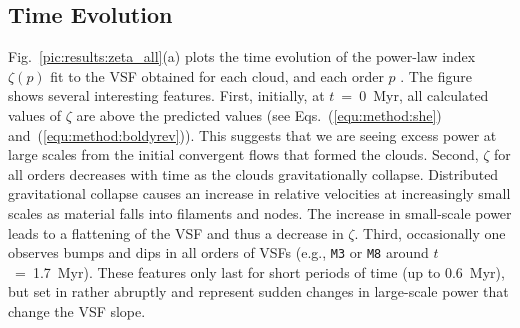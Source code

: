 \subsection{Time Evolution}

Fig.~\ref{pic:results:zeta_all}(a) plots the time evolution of the power-law index $\zeta(p)$ fit to the VSF obtained for each cloud, and each order $p$                    .
The figure shows several interesting features.
First, initially, at $t$~=~0~Myr, all calculated values of $\zeta$ are above the predicted values (see Eqs.~(\ref{equ:method:she}) and~(\ref{equ:method:boldyrev})).
     This suggests that we are seeing excess power at large scales from the initial   
     convergent flows that formed the clouds.
Second, $\zeta$ for all orders decreases with time as the clouds gravitationally collapse.
     Distributed gravitational collapse causes an increase in relative velocities at increasingly 
     small scales as material falls into filaments and nodes.  The increase in small-scale 
     power leads to a flattening of the VSF and thus a decrease in $\zeta$.
Third, occasionally one observes bumps and dips in all orders of VSFs (e.g., \texttt{M3} or \texttt{M8} around $t$~=~1.7~Myr). 
These features only last for short periods of time (up to 0.6~Myr), but set in 
   rather abruptly and represent sudden changes in large-scale power that 
   change the VSF slope. 


